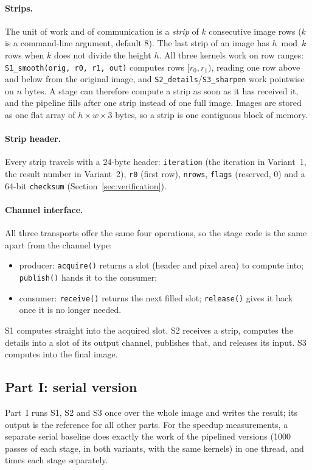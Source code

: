 \documentclass[11pt,a4paper]{article}
\newcommand{\cfgIterations}{1000}
\newcommand{\cfgK}{8}
\newcommand{\code}[1]{\texttt{#1}}
\begin{document}
\paragraph{Strips.} The unit of work and of communication is a \emph{strip} of $k$ consecutive
image rows ($k$ is a command-line argument, default \cfgK). The last strip of an image has
$h \bmod k$ rows when $k$ does not divide the height $h$. All three kernels work on row ranges:
\code{S1\_smooth(orig, r0, r1, out)} computes rows $[r_0, r_1)$, reading one row above and below
from the original image, and \code{S2\_details}/\code{S3\_sharpen} work pointwise on $n$ bytes.
A stage can therefore compute a strip as soon as it has received it, and the pipeline fills
after one strip instead of one full image. Images are stored as one flat array of
$h \times w \times 3$ bytes, so a strip is one contiguous block of memory.

\paragraph{Strip header.} Every strip travels with a 24-byte header: \code{iteration} (the
iteration in Variant~1, the result number in Variant~2), \code{r0} (first row), \code{nrows},
\code{flags} (reserved, 0) and a 64-bit \code{checksum} (Section~\ref{sec:verification}).

\paragraph{Channel interface.} All three transports offer the same four operations, so the stage
code is the same apart from the channel type:
\begin{itemize}
\item producer: \code{acquire()} returns a slot (header and pixel area) to compute into;
  \code{publish()} hands it to the consumer;
\item consumer: \code{receive()} returns the next filled slot; \code{release()} gives it back once
  it is no longer needed.
\end{itemize}
S1 computes straight into the acquired slot. S2 receives a strip, computes the details into a
slot of its output channel, publishes that, and releases its input. S3 computes into the final
image.

\subsection{Part I: serial version}
Part~I runs S1, S2 and S3 once over the whole image and writes the result; its output is the
reference for all other parts. For the speedup measurements, a separate serial baseline does
exactly the work of the pipelined versions (\cfgIterations{} passes of each stage, in both
variants, with the same kernels) in one thread, and times each stage separately.
\end{document}
